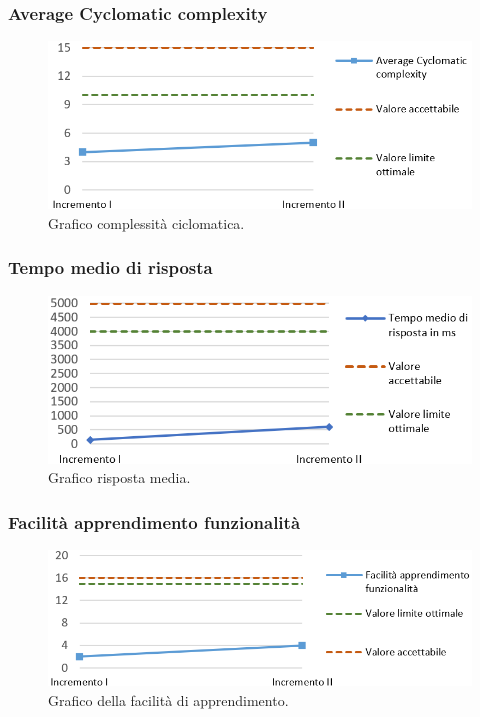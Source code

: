 \subsubsection{Average Cyclomatic complexity}
\begin{figure}[h]
	\centering
	\includegraphics[width=14cm]{Images/avComplex}
	\caption{Graﬁco complessità ciclomatica.}
\end{figure}

\subsubsection{Tempo medio di risposta}
\begin{figure}[h]
	\centering
	\includegraphics[width=14cm]{Images/tRisp}
	\caption{Graﬁco risposta media.}
\end{figure}

\newpage

\subsubsection{Facilità apprendimento funzionalità}
\begin{figure}[h]
	\centering
	\includegraphics[width=14cm]{Images/fAppr}
	\caption{Graﬁco della facilità di apprendimento.}
\end{figure}
